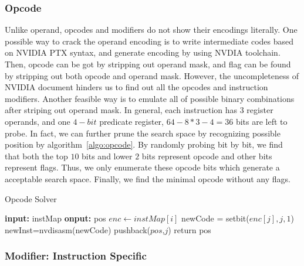 \subsubsection{Opcode}
Unlike operand, opcodes and modifiers do not show their encodings literally. One possible way to crack the operand encoding is to write intermediate codes
based on NVIDIA PTX syntax, and generate encoding by using NVDIA toolchain.
Then, opcode can be got by stripping out operand mask, and flag can be found by stripping out both opcode and operand mask. However, the uncompleteness of NVIDIA document hinders us to find out all the opcodes and instruction modifiers. Another feasible way is to emulate all of possible binary combinations after striping out operand mask.
In general, each instruction has $3$ register operands, and one $4-bit$ predicate register, $64-8*3-4=36$ bits are left to probe.
In fact, we can further prune the search space by recognizing possible position by algorithm~\ref{algo:opcode}. By randomly probing bit by bit, we find that both the top $10$ bits and lower $2$ bits represent opcode and other bits represent flags. Thus, we only enumerate these opcode bits which generate a acceptable search space. Finally, we find the minimal opcode without any flags. 


\begin{algorithm}
      \caption{Opcode Solver}\label{algo:opcode}
  \begin{algorithmic}[1]
      \State \textbf {input:} instMap
      \State \textbf {onput:} pos
      \State $enc \gets instMap[i]$ 
      \State newCode = setbit($enc[j], j, 1$)
      \State newInst=nvdisasm(newCode)
      \State pushback($pos$,$j$)
      \EndIf
      \EndIf
      \EndFor
      \EndFor
      \State return pos
  \end{algorithmic}
\end{algorithm}

\subsubsection{Modifier: Instruction Specific}

